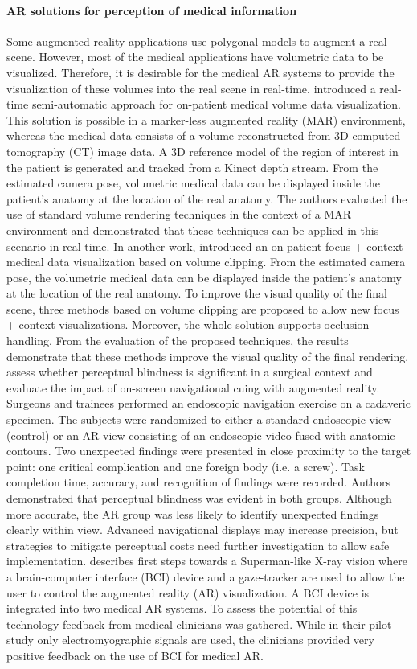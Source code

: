 \paragraph{AR solutions for perception of medical information}
Some augmented reality applications use polygonal models to augment a real scene. However, most of the medical applications have volumetric data to be visualized. Therefore, it is desirable for the medical AR systems to provide the visualization of these volumes into the real scene in real-time. 
\citet{Macedo2014} introduced a real-time semi-automatic approach for on-patient medical volume data visualization. This solution is possible in a marker-less augmented reality (MAR) environment, whereas the medical data consists of a volume reconstructed from 3D computed tomography (CT) image data. A 3D reference model of the region of interest in the patient is generated and tracked from a Kinect depth stream. From the estimated camera pose, volumetric medical data can be displayed inside the patient's anatomy at the location of the real anatomy. The authors evaluated the use of standard volume rendering techniques in the context of a MAR environment and demonstrated that these techniques can be applied in this scenario in real-time. 
In another work, \citet{Macedo2014a} introduced an on-patient focus + context medical data visualization based on volume clipping. From the estimated camera pose, the volumetric medical data can be displayed inside the patient's anatomy at the location of the real anatomy. To improve the visual quality of the final scene, three methods based on volume clipping are proposed to allow new focus + context visualizations. Moreover, the whole solution supports occlusion handling. From the evaluation of the proposed techniques, the results demonstrate that these methods improve the visual quality of the final rendering. 
\citet{Dixon2013} assess whether perceptual blindness is significant in a surgical context and evaluate the impact of on-screen navigational cuing with augmented reality. Surgeons and trainees performed an endoscopic navigation exercise on a cadaveric specimen. The subjects were randomized to either a standard endoscopic view (control) or an AR view consisting of an endoscopic video fused with anatomic contours. Two unexpected findings were presented in close proximity to the target point: one critical complication and one foreign body (i.e. a screw). Task completion time, accuracy, and recognition of findings were recorded. Authors demonstrated that perceptual blindness was evident in both groups. Although more accurate, the AR group was less likely to identify unexpected findings clearly within view. Advanced navigational displays may increase precision, but strategies to mitigate perceptual costs need further investigation to allow safe implementation.
\citet{Blum2012b} describes first steps towards a Superman-like X-ray vision where a brain-computer interface (BCI) device and a gaze-tracker are used to allow the user to control the augmented reality (AR) visualization. A BCI device is integrated into two medical AR systems. To assess the potential of this technology feedback from medical clinicians was gathered. While in their pilot study only electromyographic signals are used, the clinicians provided very positive feedback on the use of BCI for medical AR.
